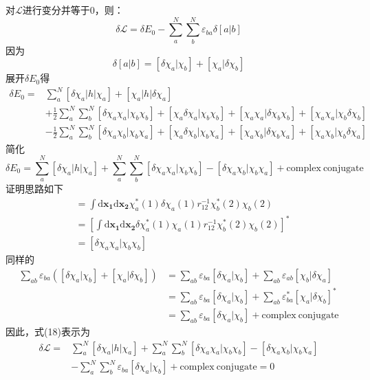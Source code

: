 \documentclass[]{article}
\begin{document}
对$\mathscr{L}$进行变分并等于0，则：
\begin{equation}
	\delta\mathscr{L}=\delta E_0-\sum\limits_a^N\sum\limits_b^N\varepsilon_{ba}\delta[a|b]
\end{equation}
因为
\begin{equation}
	\delta[a|b]=[\delta\chi_a|\chi_b]+[\chi_a|\delta\chi_b]
\end{equation}
展开$\delta E_0$得
\begin{align}
	\delta E_0=&\sum\limits_a^N[\delta \chi_a|h|\chi_a]+[\chi_a|h|\delta\chi_a]\nonumber\\
	&+\frac{1}{2}\sum\limits_a^N\sum\limits_b^N[\delta\chi_a\chi_a|\chi_b\chi_b]+[\chi_a\delta\chi_a|\chi_b\chi_b]+[\chi_a\chi_a|\delta\chi_b\chi_b]+[\chi_a\chi_a|\chi_b\delta\chi_b]\nonumber\\
	&-\frac{1}{2}\sum\limits_a^N\sum\limits_b^N[\delta\chi_a\chi_b|\chi_b\chi_a]+[\chi_a\delta\chi_b|\chi_b\chi_a]+[\chi_a\chi_b|\delta\chi_b\chi_a]+[\chi_a\chi_b|\chi_b\delta\chi_a]
\end{align}
简化
\begin{equation}
	\delta E_0=\sum\limits_a^N[\delta \chi_a|h|\chi_a]+\sum\limits_a^N\sum\limits_b^N[\delta\chi_a\chi_a|\chi_b\chi_b]-[\delta\chi_a\chi_b|\chi_b\chi_a]+\mathrm{complex\ conjugate}
\end{equation}
证明思路如下
\begin{align}
	[\chi_a\delta\chi_a|\chi_b\chi_b]
	&=\int\mathrm{d}\mathbf{x_1}\mathrm{d}\mathbf{x_2}\chi_a^*(1)\delta\chi_a(1)r^{-1}_{12}\chi_b^*(2)\chi_b(2)\nonumber\\
	&=[\int\mathrm{d}\mathbf{x_1}\mathrm{d}\mathbf{x_2}\delta\chi_a^*(1)\chi_a(1)r^{-1}_{12}\chi_b^*(2)\chi_b(2)]^*\nonumber\\
	&=[\delta\chi_a\chi_a|\chi_b\chi_b]
\end{align}
同样的
\begin{align}
	\sum\limits_{ab}\varepsilon_{ba}([\delta\chi_a|\chi_b]+[\chi_a|\delta\chi_b])
	&=\sum\limits_{ab}\varepsilon_{ba}[\delta\chi_a|\chi_b]+\sum\limits_{ab}\varepsilon_{ab}[\chi_b|\delta\chi_a]\nonumber\\
	&=\sum\limits_{ab}\varepsilon_{ba}[\delta\chi_a|\chi_b]+\sum\limits_{ab}\varepsilon_{ba}^*[\chi_a|\delta\chi_b]^*\nonumber\\
	&=\sum\limits_{ab}\varepsilon_{ba}[\delta\chi_a|\chi_b]+\mathrm{complex\ conjugate}
\end{align}
因此，式(18)表示为
\begin{align}
	\delta\mathscr{L}=
	&\sum\limits_a^N[\delta \chi_a|h|\chi_a]+\sum\limits_a^N\sum\limits_b^N[\delta\chi_a\chi_a|\chi_b\chi_b]-[\delta\chi_a\chi_b|\chi_b\chi_a]\nonumber\\
	&-\sum\limits_a^N\sum\limits_b^N\varepsilon_{ba}[\delta\chi_a|\chi_b]+\mathrm{complex\ conjugate}=0
\end{align}
\end{document}
